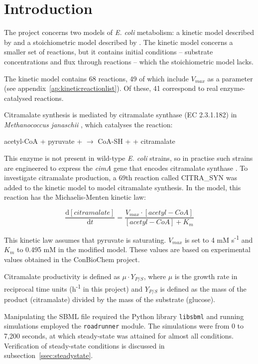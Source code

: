 \documentclass[parskip=full, numbers=noenddot]{scrreprt}
\begin{document}
\chapter*{Introduction}
\label{ch:intro}

The project concerns two models of \emph{E. coli} metabolism: a kinetic model described by \citet{millard_metabolic_2017} and a stoichiometric model described by \citet{orth_comprehensive_2011}. The kinetic model concerns a smaller set of reactions, but it contains initial conditions -- substrate concentrations and flux through reactions -- which the stoichiometric model lacks.

The kinetic model contains 68 reactions, 49 of which include $V_{max}$ as a parameter (see appendix~\ref{ap:kineticreactionlist}). Of these, 41 correspond to real enzyme-catalysed reactions.

Citramalate synthesis is mediated by citramalate synthase (EC 2.3.1.182) in \emph{Methanococcus janaschii} \citep{wu_production_2016}, which catalyses the reaction:

\begin{center}
  acetyl-CoA + pyruvate +  $\rightarrow$ CoA-SH +  + citramalate
\end{center}

This enzyme is not present in wild-type \emph{E. coli} strains, so in practise such strains are engineered to express the \emph{cimA} gene that encodes citramalate synthase \citep{wu_production_2016}.  To investigate citramalate production, a 69th reaction called CITRA\_SYN was added to the kinetic model to model citramalate synthesis.  In the model, this reaction has the Michaelis-Menten kinetic law:

\[
  \frac{\mathrm{d}[citramalate]}{\mathrm{d}t} = 
  \frac{V_{max} \cdot [acetyl-CoA]}{[acetyl-CoA] + K_{m}}
\]

This kinetic law assumes that pyruvate is saturating. $V_{max}$ is set to 4 mM s\textsuperscript{-1} and $K_{m}$ to 0.495 mM in the modified model. These values are based on experimental values obtained in the ConBioChem project.

Citramalate productivity is defined as $\mu \cdot Y_{P/S}$, where $\mu$ is the growth rate in reciprocal time units (h\textsuperscript{-1} in this project) and $Y_{P/S}$ is defined as the mass of the product (citramalate) divided by the mass of the substrate (glucose).

Manipulating the SBML file required the Python library \texttt{libsbml} and running simulations employed the \texttt{roadrunner} module. The simulations were from 0 to 7,200 seconds, at which steady-state was attained for almost all conditions. Verification of steady-state conditions is discussed in subsection~\ref{ssec:steadystate}.
\end{document}
